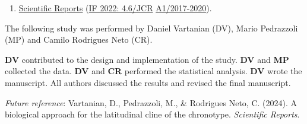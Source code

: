 \documentclass[
12pt,
openright,
oneside,
a4paper,
chapter=TITLE,
section=TITLE,
french,
spanish,
brazil,
english
]{abntex2}\usepackage{array}
\newcommand{\microskip}{\vspace{\microskipamount}}
\begin{document}
\begin{tcolorbox}[enhanced jigsaw, bottomrule=.15mm, titlerule=0mm, toprule=.15mm, coltitle=black, colbacktitle=quarto-callout-note-color!10!white, breakable, leftrule=.75mm, rightrule=.15mm, opacitybacktitle=0.6, colback=white, toptitle=1mm, title=\textcolor{quarto-callout-note-color}{\faInfo}\hspace{0.5em}{Target journal}, opacityback=0, colframe=quarto-callout-note-color-frame, bottomtitle=1mm, left=2mm, arc=.35mm]

\begin{enumerate}
\def\labelenumi{\arabic{enumi}.}
\tightlist
\item
  \href{https://www.nature.com/srep/author-instructions}{Scientific
  Reports} (\href{https://jcr.clarivate.com/jcr/}{IF 2022: 4.6/JCR}
  \textbar{}
  \href{https://sucupira.capes.gov.br/sucupira/public/consultas/coleta/veiculoPublicacaoQualis/listaConsultaGeralPeriodicos.jsf}{A1/2017-2020}).
\end{enumerate}

\end{tcolorbox}

\begin{tcolorbox}[enhanced jigsaw, bottomrule=.15mm, titlerule=0mm, toprule=.15mm, coltitle=black, colbacktitle=quarto-callout-note-color!10!white, breakable, leftrule=.75mm, rightrule=.15mm, opacitybacktitle=0.6, colback=white, toptitle=1mm, title=\textcolor{quarto-callout-note-color}{\faInfo}\hspace{0.5em}{Note}, opacityback=0, colframe=quarto-callout-note-color-frame, bottomtitle=1mm, left=2mm, arc=.35mm]

The following study was performed by Daniel Vartanian (DV), Mario
Pedrazzoli (MP) and Camilo Rodrigues Neto (CR).

\microskip

\textbf{DV} contributed to the design and implementation of the study.
\textbf{DV} and \textbf{MP} collected the data. \textbf{DV} and
\textbf{CR} performed the statistical analysis. \textbf{DV} wrote the
manuscript. All authors discussed the results and revised the final
manuscript.

\microskip

\emph{Future reference}: Vartanian, D., Pedrazzoli, M., \& Rodrigues
Neto, C. (2024). A biological approach for the latitudinal cline of the
chronotype. \emph{Scientific Reports}.

\end{tcolorbox}
\end{document}
